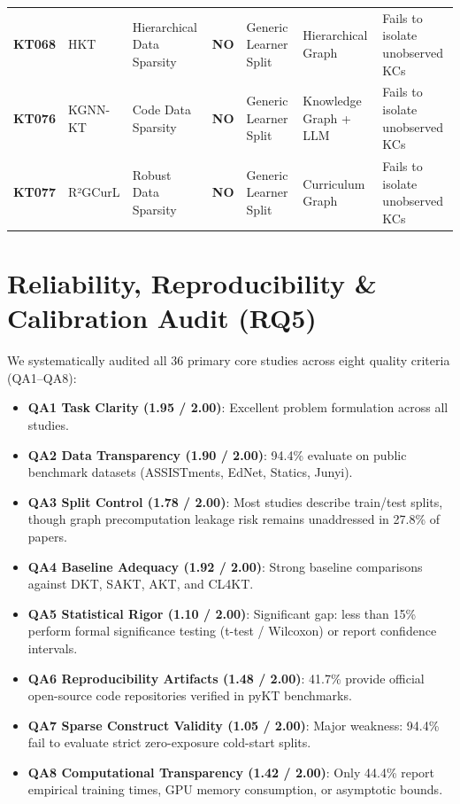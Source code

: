 \documentclass[10pt,journal,compsoc]{IEEEtran}
\begin{document}
\begin{table}[t]
{\begin{tabular}{lllllll}
\textbf{KT068} & HKT \cite{KT068_HKT_2025} & Hierarchical Data Sparsity & \textbf{NO} & Generic Learner Split & Hierarchical Graph & Fails to isolate unobserved KCs \\
\textbf{KT076} & KGNN-KT \cite{KT076_KGNNKT_2025} & Code Data Sparsity & \textbf{NO} & Generic Learner Split & Knowledge Graph + LLM & Fails to isolate unobserved KCs \\
\textbf{KT077} & R²GCurL \cite{KT077_R2GCurL_2026} & Robust Data Sparsity & \textbf{NO} & Generic Learner Split & Curriculum Graph & Fails to isolate unobserved KCs \\
\bottomrule
\end{tabular}
}
\end{table}

\section{Reliability, Reproducibility \& Calibration Audit (RQ5)}

We systematically audited all 36 primary core studies across eight quality criteria (QA1--QA8):
\begin{itemize}
    \item \textbf{QA1 Task Clarity (1.95 / 2.00)}: Excellent problem formulation across all studies.
    \item \textbf{QA2 Data Transparency (1.90 / 2.00)}: 94.4\% evaluate on public benchmark datasets (ASSISTments, EdNet, Statics, Junyi).
    \item \textbf{QA3 Split Control (1.78 / 2.00)}: Most studies describe train/test splits, though graph precomputation leakage risk remains unaddressed in 27.8\% of papers.
    \item \textbf{QA4 Baseline Adequacy (1.92 / 2.00)}: Strong baseline comparisons against DKT, SAKT, AKT, and CL4KT.
    \item \textbf{QA5 Statistical Rigor (1.10 / 2.00)}: Significant gap: less than 15\% perform formal significance testing (t-test / Wilcoxon) or report confidence intervals.
    \item \textbf{QA6 Reproducibility Artifacts (1.48 / 2.00)}: 41.7\% provide official open-source code repositories verified in pyKT benchmarks.
    \item \textbf{QA7 Sparse Construct Validity (1.05 / 2.00)}: Major weakness: 94.4\% fail to evaluate strict zero-exposure cold-start splits.
    \item \textbf{QA8 Computational Transparency (1.42 / 2.00)}: Only 44.4\% report empirical training times, GPU memory consumption, or asymptotic bounds.
\end{itemize}
\end{document}
